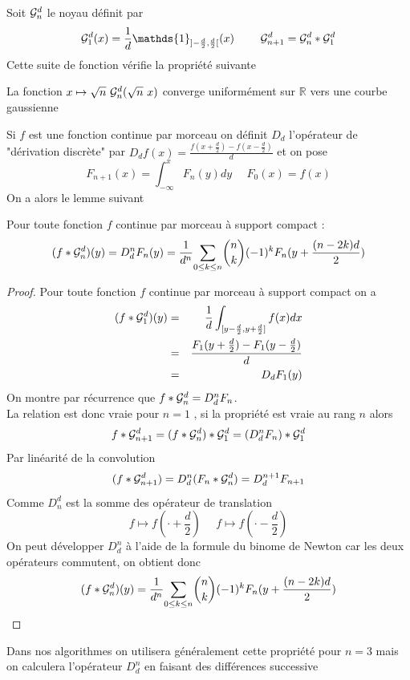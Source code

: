 Soit $\mathcal{G}_n^d$ le noyau définit par 
\begin{equation*}
\Gcal_1^d(x)=\frac{1}{d}\mathds{1}_{]-\frac{d}{2},\frac{d}{2}[}(x) ~~~~~~~\Gcal_{n+1}^d= \Gcal_n^d * \Gcal_1^d 
\label{formule_convol_n_int}
\end{equation*}
Cette suite de fonction vérifie la propriété suivante
\begin{prop}
La fonction $x\mapsto \sqrt{n}~\mathcal{G}_n^d(\sqrt{n}~x)$ converge uniformément sur $\mathbb{R}$ vers une courbe gaussienne 
\end{prop}
Si $f$ est une fonction continue par morceau on définit $D_d$ l'opérateur de "dérivation discrète" par $D_d f(x)=\frac{f(x+\frac{d}{2})-f(x-\frac{d}{2})}{d}$  et on pose
\begin{equation*}
F_{n+1}(x)= \int_{-\infty}^{x}F_{n}(y)dy~~~~~~F_{0}(x)= f(x)
\end{equation*}
On a alors le lemme suivant 
\begin{prop} Pour toute fonction $f$ continue par morceau à support compact :
\begin{equation}
 (f*\mathcal{G}_n^d)(y)=D_d^n F_{n}(y)= \frac{1}{d^n}\underset{0 \le k\le n}{\sum} \binom{n}{k}(-1)^{k} F_{n}(y+\frac{(n-2k)d}{2})
\end{equation}
\end{prop}
\begin{proof}
Pour toute fonction $f$ continue par morceau à support compact on a 
\begin{eqnarray*}
(f * \mathcal{G}_1^d )(y)&=&\frac{1}{d} \int_{[y-\frac{d}{2},y+\frac{d}{2}]} f(x) dx\\
               &=&\frac{F_{1}(y+\frac{d}{2})-F_{1}(y-\frac{d}{2})}{d}\\
               &=&D_d F_{1}(y)
\end{eqnarray*}
On montre par récurrence que $ f*\mathcal{G}_n^d=D_d^n F_{n}$.\\
La relation est donc vraie pour $n=1$ , si la propriété est vraie au rang $n$ alors
\begin{equation*}
f*\mathcal{G}_{n+1}^{d}=(f * \mathcal{G}_{n}^d) * \mathcal{G}_{1}^{d}= (D_d^n F_{n})*\mathcal{G}_1^d 
\end{equation*}
Par linéarité de la convolution
\begin{equation*}
(f*\mathcal{G}_{n+1}^{d})= D_d^n (F_{n}*\mathcal{G}_n^d) = D_d^{n+1} F_{n+1}
\end{equation*}
Comme $D_n^d$ est la somme des opérateur de translation
\begin{equation*}
f\mapsto f(\cdot+\frac{d}{2})~~~~~~f\mapsto f(\cdot-\frac{d}{2})
\end{equation*}
On peut développer $D_d^n$ à l'aide de la formule du binome de Newton car les deux opérateurs commutent, on obtient donc
\begin{equation*}
(f*\mathcal{G}_n^d)(y) = \frac{1}{d^n}\underset{0 \le k\le n}{\sum} \binom{n}{k}(-1)^{k} F_{n}(y+\frac{(n-2k)d}{2})
\end{equation*}

\end{proof}
Dans nos algorithmes  on utilisera généralement cette propriété pour $n=3$ mais on calculera l'opérateur $D_d^n$ en faisant des différences successive %


